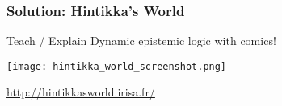 \begin{frame}
	\frametitle{Solution: Hintikka's World}
	
	\begin{block}{}
Teach /	Explain Dynamic epistemic logic with comics!
	\end{block}
	
	\begin{center}
		
		\texttt{[image: hintikka\_world\_screenshot.png]}
		
		\url{http://hintikkasworld.irisa.fr/}
		
	
	\end{center}
\end{frame}




